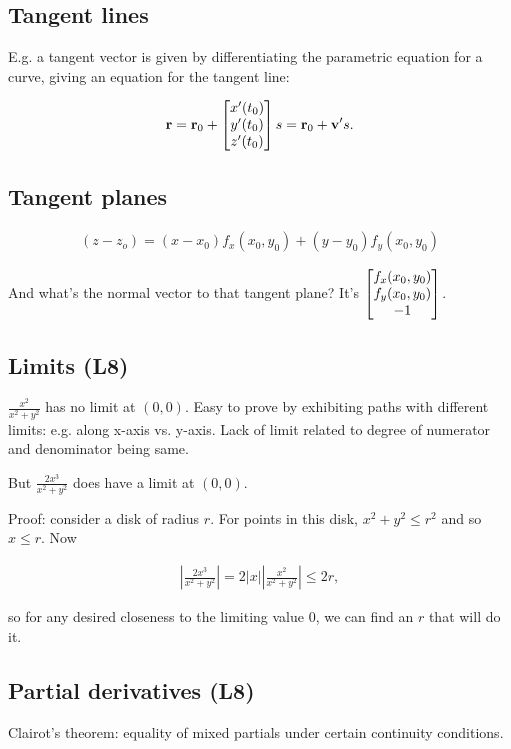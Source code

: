 \subsection*{Tangent lines}
E.g. a tangent vector is given by differentiating the parametric equation for a
curve, giving an equation for the tangent line:

\begin{align*}
  \mathbf r = \mathbf r_0 + \begin{bmatrix}x'(t_0)\\y'(t_0)\\z'(t_0)\end{bmatrix}s = \mathbf r_0 + \mathbf v' s.
\end{align*}

\subsection*{Tangent planes}

\begin{align*}
  (z - z_o) = (x - x_0)f_x(x_0, y_0) + (y - y_0)f_y(x_0, y_0)
\end{align*}

And what's the normal vector to that tangent plane? It's
$\begin{bmatrix}f_x(x_0, y_0)\\f_y(x_0, y_0)\\-1\end{bmatrix}$.


\subsection{Limits (L8)}

$\frac{x^2}{x^2 + y^2}$ has no limit at $(0, 0)$.
Easy to prove by exhibiting paths with different limits: e.g. along x-axis vs. y-axis.
Lack of limit related to degree of numerator and denominator being same.

But $\frac{2x^3}{x^2 + y^2}$ does have a limit at $(0, 0)$.

Proof: consider a disk of radius $r$. For points in this disk, $x^2 + y^2 \leq r^2$ and so $x \leq r$.
Now

\begin{align*}
  \left|\frac{2x^3}{x^2 + y^2}\right| = 2|x|\left|\frac{x^2}{x^2 + y^2}\right| \leq 2r,
\end{align*}

so for any desired closeness to the limiting value 0, we can find an $r$ that will do it.

\subsection{Partial derivatives (L8)}

Clairot's theorem: equality of mixed partials under certain continuity
conditions.


